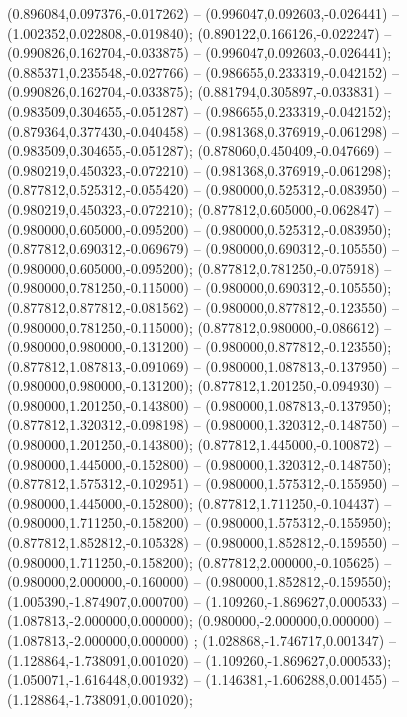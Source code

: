  (0.896084,0.097376,-0.017262) -- (0.996047,0.092603,-0.026441) -- (1.002352,0.022808,-0.019840);
 (0.890122,0.166126,-0.022247) -- (0.990826,0.162704,-0.033875) -- (0.996047,0.092603,-0.026441);
 (0.885371,0.235548,-0.027766) -- (0.986655,0.233319,-0.042152) -- (0.990826,0.162704,-0.033875);
 (0.881794,0.305897,-0.033831) -- (0.983509,0.304655,-0.051287) -- (0.986655,0.233319,-0.042152);
 (0.879364,0.377430,-0.040458) -- (0.981368,0.376919,-0.061298) -- (0.983509,0.304655,-0.051287);
 (0.878060,0.450409,-0.047669) -- (0.980219,0.450323,-0.072210) -- (0.981368,0.376919,-0.061298);
 (0.877812,0.525312,-0.055420) -- (0.980000,0.525312,-0.083950) -- (0.980219,0.450323,-0.072210);
 (0.877812,0.605000,-0.062847) -- (0.980000,0.605000,-0.095200) -- (0.980000,0.525312,-0.083950);
 (0.877812,0.690312,-0.069679) -- (0.980000,0.690312,-0.105550) -- (0.980000,0.605000,-0.095200);
 (0.877812,0.781250,-0.075918) -- (0.980000,0.781250,-0.115000) -- (0.980000,0.690312,-0.105550);
 (0.877812,0.877812,-0.081562) -- (0.980000,0.877812,-0.123550) -- (0.980000,0.781250,-0.115000);
 (0.877812,0.980000,-0.086612) -- (0.980000,0.980000,-0.131200) -- (0.980000,0.877812,-0.123550);
 (0.877812,1.087813,-0.091069) -- (0.980000,1.087813,-0.137950) -- (0.980000,0.980000,-0.131200);
 (0.877812,1.201250,-0.094930) -- (0.980000,1.201250,-0.143800) -- (0.980000,1.087813,-0.137950);
 (0.877812,1.320312,-0.098198) -- (0.980000,1.320312,-0.148750) -- (0.980000,1.201250,-0.143800);
 (0.877812,1.445000,-0.100872) -- (0.980000,1.445000,-0.152800) -- (0.980000,1.320312,-0.148750);
 (0.877812,1.575312,-0.102951) -- (0.980000,1.575312,-0.155950) -- (0.980000,1.445000,-0.152800);
 (0.877812,1.711250,-0.104437) -- (0.980000,1.711250,-0.158200) -- (0.980000,1.575312,-0.155950);
 (0.877812,1.852812,-0.105328) -- (0.980000,1.852812,-0.159550) -- (0.980000,1.711250,-0.158200);
 (0.877812,2.000000,-0.105625) -- (0.980000,2.000000,-0.160000) -- (0.980000,1.852812,-0.159550);
 (1.005390,-1.874907,0.000700) -- (1.109260,-1.869627,0.000533) -- (1.087813,-2.000000,0.000000);
 (0.980000,-2.000000,0.000000) -- (1.087813,-2.000000,0.000000) ;
 (1.028868,-1.746717,0.001347) -- (1.128864,-1.738091,0.001020) -- (1.109260,-1.869627,0.000533);
 (1.050071,-1.616448,0.001932) -- (1.146381,-1.606288,0.001455) -- (1.128864,-1.738091,0.001020);
